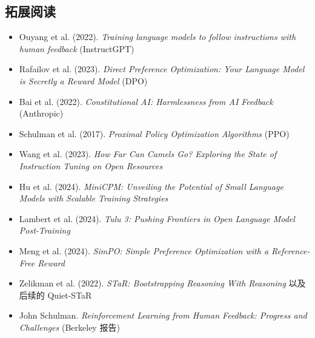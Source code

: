 \subsection{拓展阅读}

\begin{itemize}
    \item Ouyang et al. (2022). \textit{Training language models to follow instructions with human feedback} (InstructGPT)
    \item Rafailov et al. (2023). \textit{Direct Preference Optimization: Your Language Model is Secretly a Reward Model} (DPO)
    \item Bai et al. (2022). \textit{Constitutional AI: Harmlessness from AI Feedback} (Anthropic)
    \item Schulman et al. (2017). \textit{Proximal Policy Optimization Algorithms} (PPO)
    \item Wang et al. (2023). \textit{How Far Can Camels Go? Exploring the State of Instruction Tuning on Open Resources}
    \item Hu et al. (2024). \textit{MiniCPM: Unveiling the Potential of Small Language Models with Scalable Training Strategies}
    \item Lambert et al. (2024). \textit{Tulu 3: Pushing Frontiers in Open Language Model Post-Training}
    \item Meng et al. (2024). \textit{SimPO: Simple Preference Optimization with a Reference-Free Reward}
    \item Zelikman et al. (2022). \textit{STaR: Bootstrapping Reasoning With Reasoning} 以及后续的 Quiet-STaR
    \item John Schulman. \textit{Reinforcement Learning from Human Feedback: Progress and Challenges} (Berkeley 报告)
\end{itemize}


